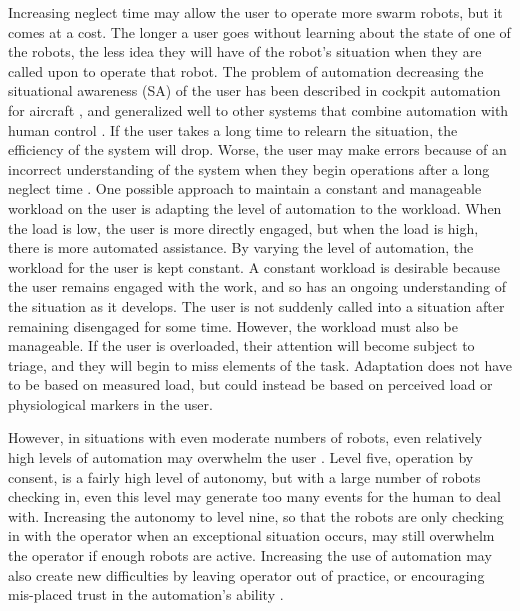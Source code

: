 Increasing neglect time may allow the user to operate more swarm robots, but it comes at a cost. 
The longer a user goes without learning about the state of one of the robots, the less idea they will have of the robot's situation when they are called upon to operate that robot. 
The problem of automation decreasing the situational awareness (SA) of the user has been described in cockpit automation for aircraft \citep{wiener1980flight}, and generalized well to other systems that combine automation with human control \citep{kaber1997out}. 
If the user takes a long time to relearn the situation, the efficiency of the system will drop. 
Worse, the user may make errors because of an incorrect understanding of the system when they begin operations after a long neglect time \citep{cummings2008predicting}. 
One possible approach to maintain a constant and manageable workload on the user is adapting the level of automation to the workload. 
When the load is low, the user is more directly engaged, but when the load is high, there is more automated assistance. 
By varying the level of automation, the workload for the user is kept constant. 
A constant workload is desirable because the user remains engaged with the work, and so has an ongoing understanding of the situation as it develops. 
The user is not suddenly called into a situation after remaining disengaged for some time. 
However, the workload must also be manageable. 
If the user is overloaded, their attention will become subject to triage, and they will begin to miss elements of the task. 
Adaptation does not have to be based on measured load, but could instead be based on perceived load or physiological markers in the user. 

However, in situations with even moderate numbers of robots, even relatively high levels of automation may overwhelm the user \citep{lewis200617}. 
Level five, operation by consent, is a fairly high level of autonomy, but with a large number of robots checking in, even this level may generate too many events for the human to deal with. 
Increasing the autonomy to level nine, so that the robots are only checking in with the operator when an exceptional situation occurs, may still overwhelm the operator if enough robots are active.
Increasing the use of automation may also create new difficulties by leaving operator out of practice, or encouraging mis-placed trust in the automation's ability \citep{lee2004trust}. 

